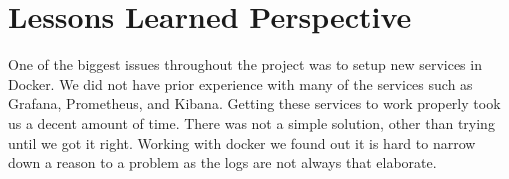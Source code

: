 \section{Lessons Learned Perspective} \label{sec:lessons}

One of the biggest issues throughout the project was to setup new services in Docker. We did not have prior experience with many of the services such as Grafana, Prometheus, and Kibana. Getting these services to work properly took us a decent amount of time. There was not a simple solution, other than trying until we got it right. Working with docker we found out it is hard to narrow down a reason to a problem as the logs are not always that elaborate.